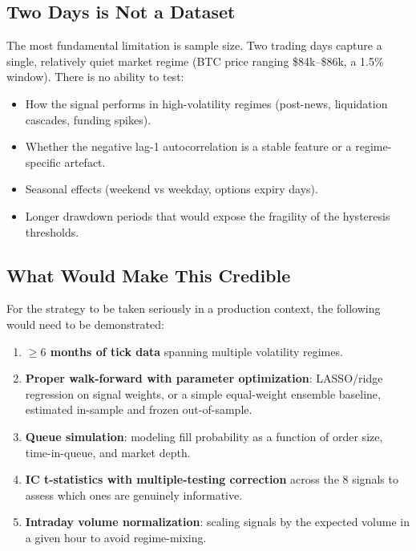 \documentclass[11pt, a4paper]{article}
\begin{document}
\subsection{Two Days is Not a Dataset}

The most fundamental limitation is sample size.  Two trading days capture
a single, relatively quiet market regime (BTC price ranging \$84k--\$86k,
a 1.5\% window).  There is no ability to test:
\begin{itemize}[leftmargin=2em, itemsep=0pt]
  \item How the signal performs in high-volatility regimes (post-news, liquidation
        cascades, funding spikes).
  \item Whether the negative lag-1 autocorrelation is a stable feature or a
        regime-specific artefact.
  \item Seasonal effects (weekend vs weekday, options expiry days).
  \item Longer drawdown periods that would expose the fragility of the
        hysteresis thresholds.
\end{itemize}

\subsection{What Would Make This Credible}

For the strategy to be taken seriously in a production context, the following
would need to be demonstrated:

\begin{enumerate}[leftmargin=2em, itemsep=2pt]
  \item \textbf{$\geq 6$ months of tick data} spanning multiple volatility regimes.
  \item \textbf{Proper walk-forward with parameter optimization}: LASSO/ridge
        regression on signal weights, or a simple equal-weight ensemble baseline,
        estimated in-sample and frozen out-of-sample.
  \item \textbf{Queue simulation}: modeling fill probability as a function of
        order size, time-in-queue, and market depth.
  \item \textbf{IC t-statistics with multiple-testing correction} across the
        8 signals to assess which ones are genuinely informative.
  \item \textbf{Intraday volume normalization}: scaling signals by the expected
        volume in a given hour to avoid regime-mixing.
\end{enumerate}
\end{document}
